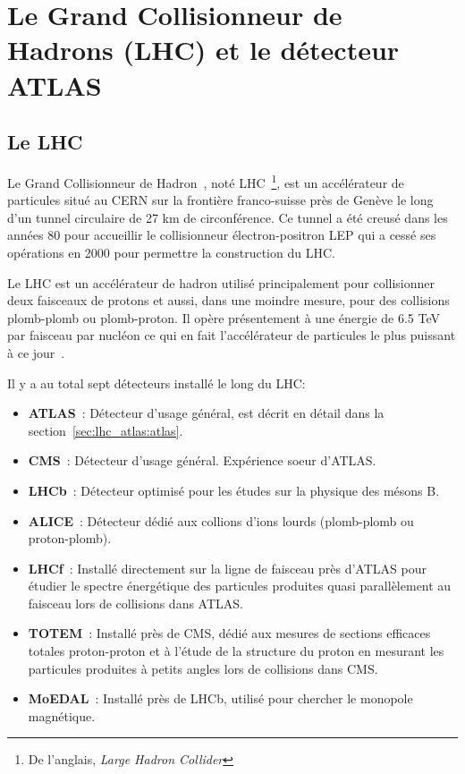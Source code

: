\singlespacing
\chapter{Le Grand Collisionneur de Hadrons (LHC) et le détecteur
  ATLAS}
\label{sec:lhc_atlas}
\doublespacing{}

\section{Le LHC}
\label{sec:lhc_atlas:lhc}

Le Grand Collisionneur de Hadron~\cite{evans_lhc_2008}, noté
LHC~\footnote{De l'anglais, \emph{Large Hadron Collider}}, est un
accélérateur de particules situé au CERN sur la frontière
franco-suisse près de Genève le long d'un tunnel circulaire de 27 km
de circonférence.  Ce tunnel a été creusé dans les années 80 pour
accueillir le collisionneur électron-positron LEP qui a cessé ses
opérations en 2000 pour permettre la construction du LHC.

Le LHC est un accélérateur de hadron utilisé principalement pour
collisionner deux faisceaux de protons et aussi, dans une moindre
mesure, pour des collisions plomb-plomb ou plomb-proton. Il opère
présentement à une énergie de 6.5 TeV par faisceau par nucléon ce qui
en fait l'accélérateur de particules le plus puissant à ce
jour~\cite{olive_parameters_2014}.

Il y a au total sept détecteurs installé le long du LHC:
\def\labelitemi{$\bullet$}
\begin{itemize}
\item \textbf{ATLAS}~\cite{collaboration_atlas_2008}: Détecteur
  d'usage général, est décrit en détail dans la
  section~\ref{sec:lhc_atlas:atlas}.
\item \textbf{CMS}~\cite{collaboration_cms_2008}: Détecteur d'usage
  général. Expérience soeur d'ATLAS.
\item \textbf{LHCb}~\cite{nakada_lhcb_2000}: Détecteur optimisé pour
  les études sur la physique des mésons B.
\item \textbf{ALICE}~\cite{collaboration_alice_2008}: Détecteur dédié
  aux collions d'ions lourds (plomb-plomb ou proton-plomb).
\item \textbf{LHCf}~\cite{collaboration_lhcf_2008}: Installé
  directement sur la ligne de faisceau près d'ATLAS pour étudier le
  spectre énergétique des particules produites quasi parallèlement au
  faisceau lors de collisions dans ATLAS.
\item \textbf{TOTEM}~\cite{collaboration_totem_2008}: Installé près de
  CMS, dédié aux mesures de sections efficaces totales proton-proton
  et à l'étude de la structure du proton en mesurant les particules
  produites à petits angles lors de collisions dans CMS.
\item \textbf{MoEDAL}~\cite{Pinfold:1181486}: Installé près de LHCb,
  utilisé pour chercher le monopole magnétique. \\
\end{itemize}

